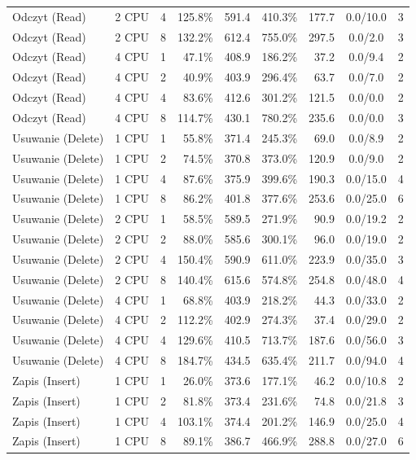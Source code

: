\begin{table}[ht]
{\begin{tabular}{llcrrrrcc}
Odczyt (Read) & 2 CPU & 4 & 125.8\% & 591.4 & 410.3\% & 177.7 & 0.0/10.0 & 3 \\
Odczyt (Read) & 2 CPU & 8 & 132.2\% & 612.4 & 755.0\% & 297.5 & 0.0/2.0 & 3 \\
Odczyt (Read) & 4 CPU & 1 & 47.1\% & 408.9 & 186.2\% & 37.2 & 0.0/9.4 & 2 \\
Odczyt (Read) & 4 CPU & 2 & 40.9\% & 403.9 & 296.4\% & 63.7 & 0.0/7.0 & 2 \\
Odczyt (Read) & 4 CPU & 4 & 83.6\% & 412.6 & 301.2\% & 121.5 & 0.0/0.0 & 2 \\
Odczyt (Read) & 4 CPU & 8 & 114.7\% & 430.1 & 780.2\% & 235.6 & 0.0/0.0 & 3 \\
Usuwanie (Delete) & 1 CPU & 1 & 55.8\% & 371.4 & 245.3\% & 69.0 & 0.0/8.9 & 2 \\
Usuwanie (Delete) & 1 CPU & 2 & 74.5\% & 370.8 & 373.0\% & 120.9 & 0.0/9.0 & 2 \\
Usuwanie (Delete) & 1 CPU & 4 & 87.6\% & 375.9 & 399.6\% & 190.3 & 0.0/15.0 & 4 \\
Usuwanie (Delete) & 1 CPU & 8 & 86.2\% & 401.8 & 377.6\% & 253.6 & 0.0/25.0 & 6 \\
Usuwanie (Delete) & 2 CPU & 1 & 58.5\% & 589.5 & 271.9\% & 90.9 & 0.0/19.2 & 2 \\
Usuwanie (Delete) & 2 CPU & 2 & 88.0\% & 585.6 & 300.1\% & 96.0 & 0.0/19.0 & 2 \\
Usuwanie (Delete) & 2 CPU & 4 & 150.4\% & 590.9 & 611.0\% & 223.9 & 0.0/35.0 & 3 \\
Usuwanie (Delete) & 2 CPU & 8 & 140.4\% & 615.6 & 574.8\% & 254.8 & 0.0/48.0 & 4 \\
Usuwanie (Delete) & 4 CPU & 1 & 68.8\% & 403.9 & 218.2\% & 44.3 & 0.0/33.0 & 2 \\
Usuwanie (Delete) & 4 CPU & 2 & 112.2\% & 402.9 & 274.3\% & 37.4 & 0.0/29.0 & 2 \\
Usuwanie (Delete) & 4 CPU & 4 & 129.6\% & 410.5 & 713.7\% & 187.6 & 0.0/56.0 & 3 \\
Usuwanie (Delete) & 4 CPU & 8 & 184.7\% & 434.5 & 635.4\% & 211.7 & 0.0/94.0 & 4 \\
Zapis (Insert) & 1 CPU & 1 & 26.0\% & 373.6 & 177.1\% & 46.2 & 0.0/10.8 & 2 \\
Zapis (Insert) & 1 CPU & 2 & 81.8\% & 373.4 & 231.6\% & 74.8 & 0.0/21.8 & 3 \\
Zapis (Insert) & 1 CPU & 4 & 103.1\% & 374.4 & 201.2\% & 146.9 & 0.0/25.0 & 4 \\
Zapis (Insert) & 1 CPU & 8 & 89.1\% & 386.7 & 466.9\% & 288.8 & 0.0/27.0 & 6 \\

\end{tabular}}
\end{table}
